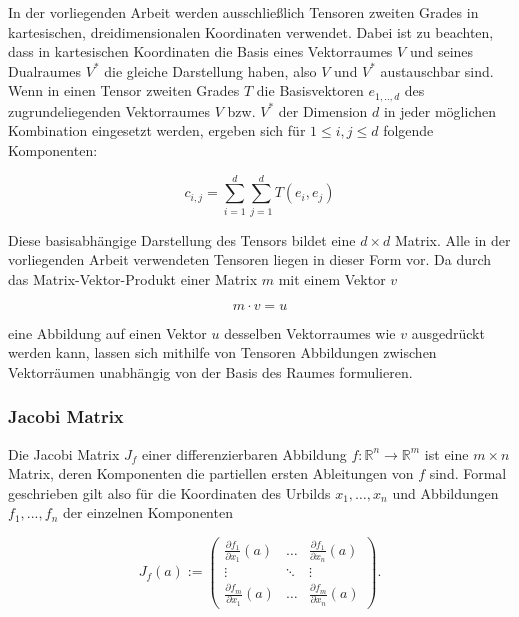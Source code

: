 \documentclass[a4paper,fontsize=12pt,toc=bib,parskip=half,ngerman]{scrartcl}
\begin{document}
In der vorliegenden Arbeit werden ausschlie{\ss}lich Tensoren zweiten Grades in kartesischen, dreidimensionalen Koordinaten verwendet. Dabei ist zu beachten, dass in kartesischen Koordinaten die Basis eines Vektorraumes $V$ und seines Dualraumes $V^*$ die gleiche Darstellung haben, also $V$ und $V^*$ austauschbar sind. Wenn in einen Tensor zweiten Grades $T$ die Basisvektoren $e_{1,..,d}$ des zugrundeliegenden Vektorraumes $V$ bzw. $V^*$ der Dimension $d$ in jeder m\"oglichen Kombination eingesetzt werden, ergeben sich f\"ur $1\leq i,j\leq d$ folgende Komponenten:

\begin{equation}
	c_{i,j} = \sum_{i=1}^{d} \sum_{j=1}^{d} T(e_i, e_j)
\end{equation}

Diese basisabh\"angige Darstellung des Tensors bildet eine $d\times d$ Matrix. Alle in der vorliegenden Arbeit verwendeten Tensoren liegen in dieser Form vor. Da durch das Matrix-Vektor-Produkt einer Matrix $m$ mit einem Vektor $v$

\begin{equation}
	m \cdot v = u
\end{equation} 

eine Abbildung auf einen Vektor $u$ desselben Vektorraumes wie $v$ ausgedr\"uckt werden kann, lassen sich mithilfe von Tensoren Abbildungen zwischen Vektorr\"aumen unabh\"angig von der Basis des Raumes formulieren.

\subsubsection{Jacobi Matrix}
Die Jacobi Matrix $J_f$ einer differenzierbaren Abbildung $f: \mathbb{R}^n \rightarrow \mathbb{R}^m$ ist eine $m \times n$ Matrix, deren Komponenten die partiellen ersten Ableitungen von $f$ sind. Formal geschrieben gilt also f\"ur die Koordinaten des Urbilds $x_1, \dots, x_n$ und Abbildungen $f_1, ..., f_n$ der einzelnen Komponenten

\begin{equation}
J_f(a) := 
\begin{pmatrix}
\frac{\partial f_1}{\partial x_1}(a) & \dots & \frac{\partial f_1}{\partial x_n}(a)  \\
\vdots & \ddots & \vdots \\
\frac{\partial f_m}{\partial x_1}(a) & \dots & \frac{\partial f_m}{\partial x_n}(a) 
\end{pmatrix}.
\end{equation}
\end{document}
